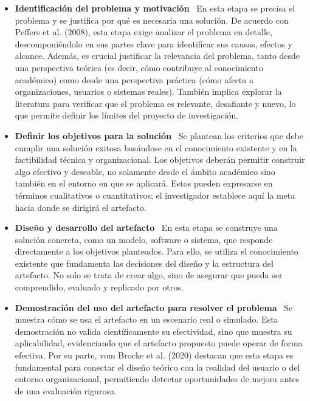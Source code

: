 \begin{itemize}[align=left, label=--]
\item \textbf{Identificación del problema y motivación} \
En esta etapa se precisa el problema y se justifica por qué es necesaria una solución. De acuerdo con Peffers et al. (2008), esta etapa exige analizar el problema en detalle, descomponiéndolo en sus partes clave para identificar sus causas, efectos y alcance. Además, es crucial justificar la relevancia del problema, tanto desde una perspectiva teórica (es decir, cómo contribuye al conocimiento académico) como desde una perspectiva práctica (cómo afecta a organizaciones, usuarios o sistemas reales).
También implica explorar la literatura para verificar que el problema es relevante, desafiante y nuevo, lo que permite definir los límites del proyecto de investigación.

\item \textbf{Definir los objetivos para la solución} \
Se plantean los criterios que debe cumplir una solución exitosa basándose en el conocimiento existente y en la factibilidad técnica y organizacional.
Los objetivos deberán permitir construir algo efectivo y deseable, no solamente desde el ámbito académico sino también en el entorno en que se aplicará. Estos pueden expresarse en términos cualitativos o cuantitativos; el investigador establece aquí la meta hacia donde se dirigirá el artefacto.

\item \textbf{Diseño y desarrollo del artefacto} \
En esta etapa se construye una solución concreta, como un modelo, software o sistema, que responde directamente a los objetivos planteados. Para ello, se utiliza el conocimiento existente que fundamenta las decisiones del diseño y la estructura del artefacto. No solo se trata de crear algo, sino de asegurar que pueda ser comprendido, evaluado y replicado por otros.

\item \textbf{Demostración del uso del artefacto para resolver el problema} \
Se muestra cómo se usa el artefacto en un escenario real o simulado. Esta demostración no valida científicamente su efectividad, sino que muestra su aplicabilidad, evidenciando que el artefacto propuesto puede operar de forma efectiva.
Por su parte, vom Brocke et al. (2020) destacan que esta etapa es fundamental para conectar el diseño teórico con la realidad del usuario o del entorno organizacional, permitiendo detectar oportunidades de mejora antes de una evaluación rigurosa.


\end{itemize}

